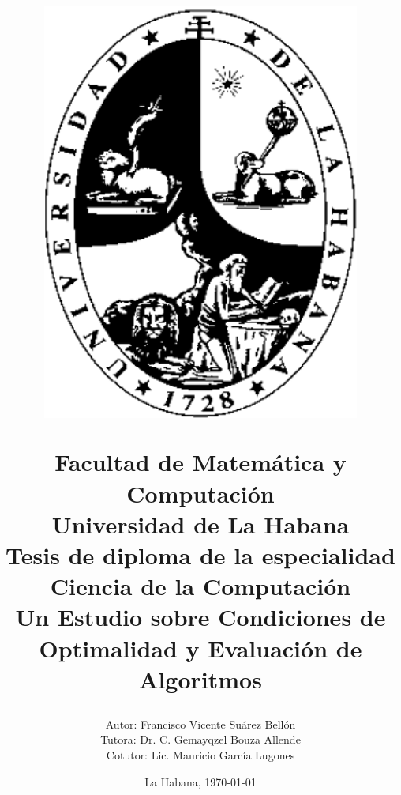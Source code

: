 \begin{titlepage}
	
	\title{\vspace*{-70pt}
		\begin{figure}
			\includegraphics[scale=0.2]{img/logo.png}
		\end{figure} 
		\vspace*{10pt}Facultad de Matemática y Computación \\
		Universidad de La Habana \\
		\vspace*{20pt}	
		Tesis de diploma de la especialidad \\ 
		Ciencia de la Computación \\
		
		\vspace*{20pt}
		Un Estudio sobre
		Condiciones de Optimalidad y Evaluación de
		Algoritmos %
		\vspace*{-35pt}
		\author{{\large Autor: Francisco Vicente Suárez Bellón \vspace*{15pt}} \\
			{\large Tutora: Dr. C. Gemayqzel Bouza Allende} \\ \hspace{10pt} {\large Cotutor: Lic. Mauricio García Lugones}\vspace*{100pt}}
		
		\date{La Habana, \today}
	}
	
\end{titlepage}